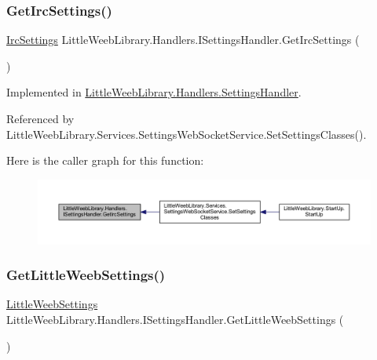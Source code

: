 \subsubsection{\texorpdfstring{Get\+Irc\+Settings()}{GetIrcSettings()}}
{\footnotesize\ttfamily \mbox{\hyperlink{class_little_weeb_library_1_1_settings_1_1_irc_settings}{Irc\+Settings}} Little\+Weeb\+Library.\+Handlers.\+I\+Settings\+Handler.\+Get\+Irc\+Settings (\begin{DoxyParamCaption}{ }\end{DoxyParamCaption})}



Implemented in \mbox{\hyperlink{class_little_weeb_library_1_1_handlers_1_1_settings_handler_a22195b5d1df129295e0e30298611bdba}{Little\+Weeb\+Library.\+Handlers.\+Settings\+Handler}}.



Referenced by Little\+Weeb\+Library.\+Services.\+Settings\+Web\+Socket\+Service.\+Set\+Settings\+Classes().

Here is the caller graph for this function\+:\nopagebreak
\begin{figure}[H]
\begin{center}
\leavevmode
\includegraphics[width=350pt]{interface_little_weeb_library_1_1_handlers_1_1_i_settings_handler_a8ee9be789e628c80fae0db96d890569b_icgraph}
\end{center}
\end{figure}
\mbox{\label{interface_little_weeb_library_1_1_handlers_1_1_i_settings_handler_a493bc8df18211fa8c3874371b809e006}} 
\subsubsection{\texorpdfstring{Get\+Little\+Weeb\+Settings()}{GetLittleWeebSettings()}}
{\footnotesize\ttfamily \mbox{\hyperlink{class_little_weeb_library_1_1_settings_1_1_little_weeb_settings}{Little\+Weeb\+Settings}} Little\+Weeb\+Library.\+Handlers.\+I\+Settings\+Handler.\+Get\+Little\+Weeb\+Settings (\begin{DoxyParamCaption}{ }\end{DoxyParamCaption})}



